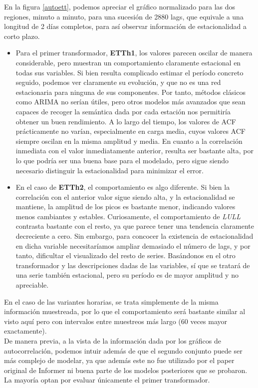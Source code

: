 En la figura \ref{autoett}, podemos apreciar el gráfico normalizado para las dos regiones, minuto a minuto, para una sucesión de 2880 lags, que equivale a una longitud de 2 días completos, para así observar información de estacionalidad a corto plazo.

\begin{itemize}
	\item Para el primer transformador, \textbf{ETTh1}, los valores parecen oscilar de manera considerable, pero muestran un comportamiento claramente estacional en todas sus variables. Si bien resulta complicado estimar el período concreto seguido, podemos ver claramente su evolución, y que no es una red estacionaria para ninguna de sus componentes. Por tanto, métodos clásicos como ARIMA no serían útiles, pero otros modelos más avanzados que sean capaces de recoger la semántica dada por cada estación nos permitiría obtener un buen rendimiento. A lo largo del tiempo, los valores de ACF prácticamente no varían, especialmente en carga media, cuyos valores ACF siempre oscilan en la misma amplitud y media. En cuanto a la correlación inmediata con el valor inmediatamente anterior, resulta ser bastante alta, por lo que podría ser una buena base para el modelado, pero sigue siendo necesario distinguir la estacionalidad para minimizar el error.
	\item En el caso de \textbf{ETTh2}, el comportamiento es algo diferente. Si bien la correlación con el anterior valor sigue siendo alta, y la estacionalidad se mantiene, la amplitud de los picos es bastante menor, indicando valores menos cambiantes y estables. Curiosamente, el comportamiento de \textit{LULL} contrasta bastante con el resto, ya que parece tener una tendencia claramente decreciente a cero. Sin embargo, para concocer la existencia de estacionalidad en dicha variable necesitaríamos ampliar demasiado el número de lags, y por tanto, dificultar el visualizado del resto de series. Basándonos en el otro transformador y las descripciones dadas de las variables, sí que se tratará de una serie también estacional, pero su período es de mayor amplitud y no apreciable.
\end{itemize}

En el caso de las variantes horarias, se trata simplemente de la misma información muestreada, por lo que el comportamiento será bastante similar al visto aquí pero con intervalos entre muestreos más largo (60 veces mayor exactamente).\\

De manera previa, a la vista de la información dada por los gráficos de autocorrelación, podemos intuir además de que el segundo conjunto puede ser más complejo de modelar, ya que además este no fue utilizado por el paper original de Informer ni buena parte de los modelos posteriores que se probaron. La mayoría optan por evaluar únicamente el primer transformador.

